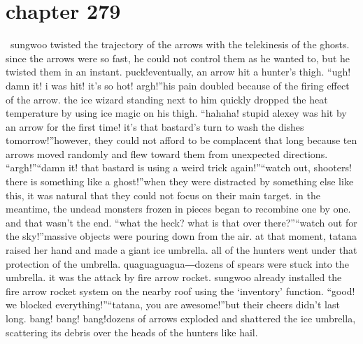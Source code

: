 \section{chapter 279}






 sungwoo twisted the trajectory of the arrows with the telekinesis of the ghosts.
 since the arrows were so fast, he could not control them as he wanted to, but he twisted them in an instant.
puck!eventually, an arrow hit a hunter’s thigh.
“ugh! damn it! i was hit! it’s so hot! argh!”his pain doubled because of the firing effect of the arrow.
 the ice wizard standing next to him quickly dropped the heat temperature by using ice magic on his thigh.
“hahaha! stupid alexey was hit by an arrow for the first time! it’s that bastard’s turn to wash the dishes tomorrow!”however, they could not afford to be complacent that long because ten arrows moved randomly and flew toward them from unexpected directions.
“argh!”“damn it! that bastard is using a weird trick again!”“watch out, shooters! there is something like a ghost!”when they were distracted by something else like this, it was natural that they could not focus on their main target.
in the meantime, the undead monsters frozen in pieces began to recombine one by one.
and that wasn’t the end.
“what the heck? what is that over there?”“watch out for the sky!”massive objects were pouring down from the air.
 at that moment, tatana raised her hand and made a giant ice umbrella.
 all of the hunters went under that protection of the umbrella.
quaguaguagua―dozens of spears were stuck into the umbrella.
 it was the attack by fire arrow rocket.
 sungwoo already installed the fire arrow rocket system on the nearby roof using the ‘inventory’ function.
“good! we blocked everything!”“tatana, you are awesome!”but their cheers didn’t last long.
bang! bang! bang!dozens of arrows exploded and shattered the ice umbrella, scattering its debris over the heads of the hunters like hail.

